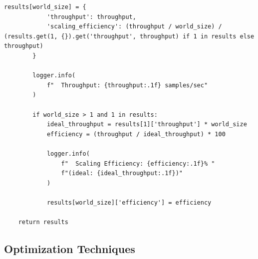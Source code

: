 \begin{lstlisting}[style=python, caption=Distributed Training Performance Profiler]
        results[world_size] = {
            'throughput': throughput,
            'scaling_efficiency': (throughput / world_size) / (results.get(1, {}).get('throughput', throughput) if 1 in results else throughput)
        }

        logger.info(
            f"  Throughput: {throughput:.1f} samples/sec"
        )

        if world_size > 1 and 1 in results:
            ideal_throughput = results[1]['throughput'] * world_size
            efficiency = (throughput / ideal_throughput) * 100

            logger.info(
                f"  Scaling Efficiency: {efficiency:.1f}% "
                f"(ideal: {ideal_throughput:.1f})"
            )

            results[world_size]['efficiency'] = efficiency

    return results
\end{lstlisting}

\subsection{Optimization Techniques}


